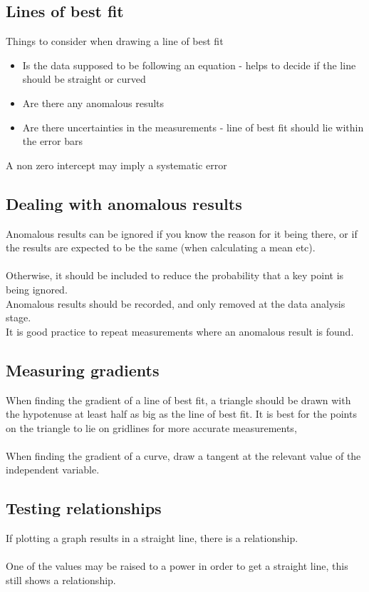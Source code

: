 \documentclass{article}[18pt]
\begin{document}
\subsection{Lines of best fit}
Things to consider when drawing a line of best fit
\begin{itemize}
\item Is the data supposed to be following an equation - helps to decide if the line should be straight or curved
\item Are there any anomalous results
\item Are there uncertainties in the measurements - line of best fit should lie within the error bars
\end{itemize}
A non zero intercept may imply a systematic error
\subsection{Dealing with anomalous results}
Anomalous results can be ignored if you know the reason for it being there, or if the results are expected to be the same (when calculating a mean etc).\\
\\
Otherwise, it should be included to reduce the probability that a key point is being ignored.\\
Anomalous results should be recorded, and only removed at the data analysis stage.\\
It is good practice to repeat measurements where an anomalous result is found.
\subsection{Measuring gradients}
When finding the gradient of a line of best fit, a triangle should be drawn with the hypotenuse at least half as big as the line of best fit. It is best for the points on the triangle to lie on gridlines for more accurate measurements,\\
\\
When finding the gradient of a curve, draw a tangent at the relevant value of the independent variable.
\subsection{Testing relationships}
If plotting a graph results in a straight line, there is a relationship.\\
\\
One of the values may be raised to a power in order to get a straight line, this still shows a relationship.
\end{document}

